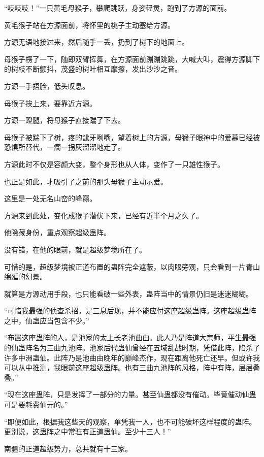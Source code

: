 
\begin{this_body}

“吱吱吱！”一只黄毛母猴子，攀爬跳跃，身姿轻灵，跑到了方源的面前。

黄毛猴子站在方源面前，将怀里的桃子主动塞给方源。

方源无语地接过来，然后随手一丢，扔到了树下的地面上。

母猴子楞了一下，随即双臂挥舞，在方源面前蹦蹦跳跳，大喊大叫，震得方源脚下的树枝不断颤抖，茂盛的树叶相互摩擦，发出沙沙之音。

方源一手捂脸，低头叹息。

母猴子挨上来，要靠近方源。

方源一蹬腿，将母猴子直接踹了下去。

母猴子被踹下了树，疼的龇牙咧嘴，望着树上的方源，母猴子眼神中的爱慕已经被恐惧所替代，一瘸一拐灰溜溜地走了。

方源此时不仅是容颜大变，整个身形也从人体，变作了一只雄性猴子。

也正是如此，才吸引了之前的那头母猴子主动示爱。

这里是一处无名山峦的峰巅。

方源来到此处，变化成猴子潜伏下来，已经有近半个月之久了。

他隐藏身份，重点观察超级蛊阵。

没有错，在他的眼前，就是超级梦境所在了。

可惜的是，超级梦境被正道布置的蛊阵完全遮蔽，以肉眼旁观，只会看到一片青山绵延的幻景。

就算是方源动用手段，也只能看破一些外表，蛊阵当中的情景仍旧是迷迷糊糊。

“可惜我最强的侦查杀招，是三息后现，并不能应付这座超级蛊阵。这座超级蛊阵之中，仙蛊应当包含不少。”

“布置这座蛊阵的人，是池家的太上长老池曲由。此人乃是阵道大宗师，平生最强的仙蛊阵名为三曲九池阵。池家后代蛊仙曾经在五域乱战时期，凭借此阵，陷杀了许多中洲蛊仙。此阵乃是池曲由晚年的巅峰杰作，现在距离他死亡还早。但或许我可以从中推测，我眼前这座超级蛊阵。也有三曲九池阵的风格，阵中有阵，层层叠叠。”

“现在这座蛊阵，只是发挥了一部分的力量。甚至仙蛊都没有催动。毕竟催动仙蛊可是要耗费仙元的。”

“即便如此，根据我这些天的观察，单凭我一人，也不可能破坏这样程度的蛊阵。更别说，这蛊阵之中常驻有正道蛊仙。至少十三人！”

南疆的正道超级势力，总共就有十三家。


\end{this_body}
